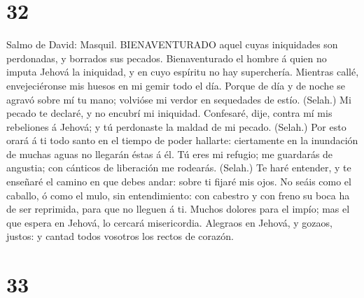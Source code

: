 \hypertarget{section-31}{%
\section{32}\label{section-31}}

 Salmo de David: Masquil. BIENAVENTURADO aquel cuyas
iniquidades son perdonadas, y borrados sus pecados. 
Bienaventurado el hombre á quien no imputa Jehová la iniquidad, y en
cuyo espíritu no hay superchería.  Mientras callé,
envejeciéronse mis huesos en mi gemir todo el día.  Porque
de día y de noche se agravó sobre mí tu mano; volvióse mi verdor en
sequedades de estío. (Selah.)  Mi pecado te declaré, y no
encubrí mi iniquidad. Confesaré, dije, contra mí mis rebeliones á
Jehová; y tú perdonaste la maldad de mi pecado. (Selah.) 
Por esto orará á ti todo santo en el tiempo de poder hallarte:
ciertamente en la inundación de muchas aguas no llegarán éstas á él.
 Tú eres mi refugio; me guardarás de angustia; con cánticos
de liberación me rodearás. (Selah.)  Te haré entender, y te
enseñaré el camino en que debes andar: sobre ti fijaré mis ojos.
 No seáis como el caballo, ó como el mulo, sin
entendimiento: con cabestro y con freno su boca ha de ser reprimida,
para que no lleguen á ti.  Muchos dolores para el impío;
mas el que espera en Jehová, lo cercará misericordia. 
Alegraos en Jehová, y gozaos, justos: y cantad todos vosotros los rectos
de corazón.

\hypertarget{section-32}{%
\section{33}\label{section-32}}

